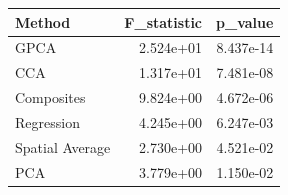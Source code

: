 \begin{tabular}{lrr}
\toprule
Method & F_statistic & p_value \\
\midrule
GPCA & 2.524e+01 & 8.437e-14 \\
CCA & 1.317e+01 & 7.481e-08 \\
Composites & 9.824e+00 & 4.672e-06 \\
Regression & 4.245e+00 & 6.247e-03 \\
Spatial Average & 2.730e+00 & 4.521e-02 \\
PCA & 3.779e+00 & 1.150e-02 \\
\bottomrule
\end{tabular}
